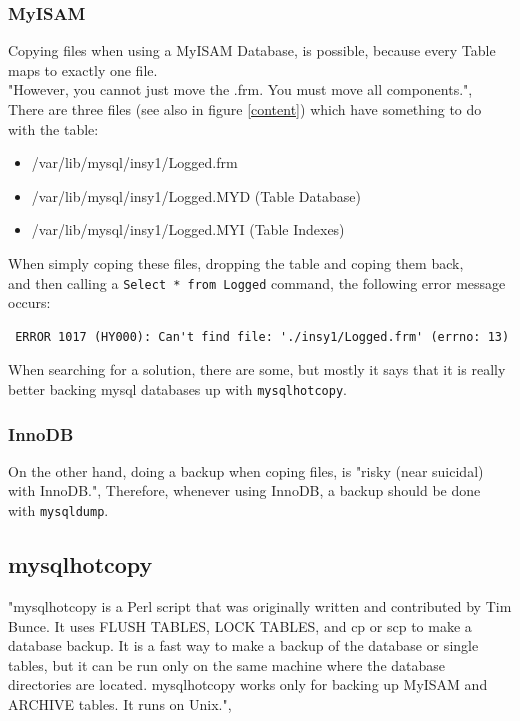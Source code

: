\documentclass[10pt]{article}
\begin{document}
\subsubsection{MyISAM}
Copying files when using a MyISAM Database, is possible, because every Table maps to exactly one file. \\
"However, you cannot just move the .frm. You must move all components.", \cite{so1} \\
There are three files (see also in figure \ref{content}) which have something to do with the table:
\begin{itemize}
\item /var/lib/mysql/insy1/Logged.frm
\item /var/lib/mysql/insy1/Logged.MYD (Table Database)
\item /var/lib/mysql/insy1/Logged.MYI (Table Indexes)
\end{itemize}
When simply coping these files, dropping the table and coping them back, \\ and then calling a \texttt{Select * from Logged} command, the following error message occurs:
\begin{lstlisting}
 ERROR 1017 (HY000): Can't find file: './insy1/Logged.frm' (errno: 13)
\end{lstlisting}
When searching for a solution, there are some, but mostly it says that it is really better backing mysql databases up with \texttt{mysqlhotcopy}.
\subsubsection{InnoDB}
On the other hand, doing a backup when coping files, is "risky (near suicidal) with InnoDB.",\cite{so1}
Therefore, whenever using InnoDB, a backup should be done with \texttt{mysqldump}.
\subsection{mysqlhotcopy}
"mysqlhotcopy is a Perl script that was originally written and contributed by Tim Bunce. It uses FLUSH TABLES, LOCK TABLES, and cp or scp to make a database backup. It is a fast way to make a backup of the database or single tables, but it can be run only on the same machine where the database directories are located. mysqlhotcopy works only for backing up MyISAM and ARCHIVE tables. It runs on Unix.",\cite{mysqlhotcopyman}
\end{document}
